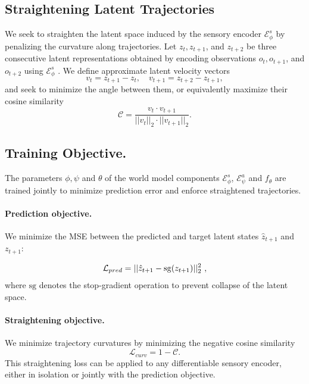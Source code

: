 \subsection{Straightening Latent Trajectories}
We seek to straighten the latent space induced by the sensory encoder $\mathcal{E}^s_\phi$ by penalizing the curvature along trajectories. Let $z_t, z_{t+1}$, and $z_{t+2}$ be three consecutive latent representations  obtained by encoding observations $o_t, o_{t+1}$, and $o_{t+2}$ using $\mathcal{E}^s_\phi$ . We define approximate latent velocity vectors
\begin{equation}
v_t = z_{t+1} - z_t, \quad v_{t+1} = z_{t+2} - z_{t+1},
\end{equation}
and seek to minimize the angle between them, or equivalently maximize their cosine similarity
\begin{equation}
\label{eq:cossim}
\mathcal{C}= \frac{v_t \cdot v_{t+1}}{||v_t||_2 \cdot ||v_{t+1}||_2}.
\end{equation}

\subsection{Training Objective.}

The parameters $\phi, \psi$ and $\theta$ of the world model components $\mathcal{E}^s_\phi$, $\mathcal{E}^a_\psi$ and $f_\theta$ are trained jointly to minimize prediction error and enforce straightened trajectories. 

\paragraph{Prediction objective.} We minimize the MSE between the predicted and target latent states $\hat{z}_{t+1}$ and $z_{t+1}$:

\begin{equation}
\mathcal{L}_{pred} = || \hat{z}_{t+1} - \operatorname{sg}(z_{t+1}) ||_2^2 \\ \text{ },
\label{eq:pred}
\end{equation}
where $\mathrm{sg}$ denotes the stop-gradient operation to prevent collapse of the latent space.

\paragraph{Straightening objective.}
We minimize trajectory curvatures by minimizing the negative cosine similarity
\begin{equation}
\mathcal{L}_{curv} = 1 - \mathcal{C}.
\label{eq:curvature}
\end{equation}
This straightening loss can be applied to any differentiable sensory encoder, either in isolation or jointly with the prediction objective.

